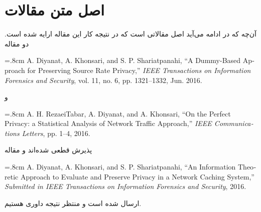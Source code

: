 \chapter{اصل متن مقالات}
\label{chap:origpaper}
آن‌چه که در ادامه می‌آید اصل مقالاتی است که در نتیجه کار این مقاله ارایه شده است. دو مقاله 
\begin{latin}
\baselineskip=.8cm
A. Diyanat, A. Khonsari, and S. P. Shariatpanahi, “A Dummy-Based Approach for Preserving Source Rate Privacy,” \textit{IEEE Transactions on Information Forensics and Security}, vol. 11, no. 6, pp. 1321–1332, Jun. 2016.
\end{latin}
و
\begin{latin}
\baselineskip=.8cm
A. H. RezaeiTabar, A. Diyanat, and A. Khonsari, “On the Perfect Privacy: a Statistical Analysis of Network Traffic Approach,” \textit{IEEE Communications Letters}, pp. 1–4, 2016.
\end{latin}
\noindent
پذیرش قطعی شده‌اند و مقاله
\begin{latin}
\baselineskip=.8cm
A. Diyanat, A. Khonsari, and S. P. Shariatpanahi, “An Information Theoretic Approach to Evaluate and Preserve Privacy in a Network Caching System,” \textit{Submitted in IEEE Transactions on Information Forensics and Security}, 2016.
\end{latin}
ارسال شده است و منتظر نتیجه داوری هستیم.